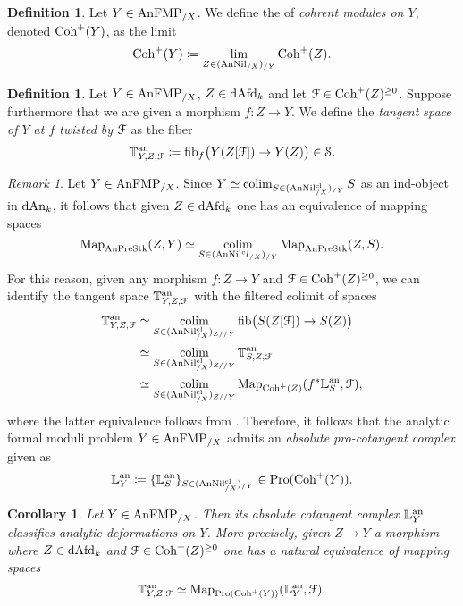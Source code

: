 \documentclass[10pt,a4paper,reqno]{amsart} %
\theoremstyle{plain}
\newtheorem{cor}[thm]{Corollary}
\theoremstyle{definition}
\newtheorem{defin}[thm]{Definition}
\theoremstyle{remark}
\newtheorem{rem}[thm]{Remark}
\numberwithin{equation}{section}
\begin{document}
\begin{defin}
    Let $Y \in \mathrm{AnFMP}_{/X}$. We define the \infcat of \emph{cohrent modules on $Y$}, denoted $\mathrm{Coh}^+(Y)$, as the limit
        \[
            \mathrm{Coh}^+(Y) \coloneqq \lim_{Z \in (\mathrm{AnNil}_{/X})_{/Y}}  \mathrm{Coh}^+(Z).
        \]
\end{defin}

\begin{defin} Let $Y \in \mathrm{AnFMP}_{/X}$, $Z \in \mathrm{dAfd}_k$ and let $\mathcal F \in \mathrm{Coh}^+(Z)^{\ge 0}$. Suppose furthermore that we are given a morphism $f \colon Z \to Y$.
    We define the \emph{tangent space of $Y$ at $f$ twisted by $\mathcal F$} as the fiber
        \[
            \mathbb T^\mathrm{an}_{Y, Z, \mathcal F} \coloneqq \mathrm{fib}_f\big( Y(Z[\mathcal F]) \to Y(Z) \big) 
            \in \mathcal S.  
        \]
\end{defin}

\begin{rem} Let $Y \in \mathrm{AnFMP}_{/X}$.
    Since $Y \simeq \operatorname*{colim}_{S \in (\mathrm{AnNil}^{\mathrm{cl}}_{/X})_{/Y}} S$ as an ind-object in $\mathrm{dAn}_k$, it follows that given $Z \in \mathrm{dAfd}_k$ one has an equivalence of mapping spaces
        \[
            \operatorname{Map}_{\mathrm{AnPreStk}}(Z, Y) \simeq \operatorname*{colim}_{S \in (\mathrm{AnNil}^cl_{/X})_{/Y}}  \operatorname{Map}_{\mathrm{AnPreStk}}(Z,S ).
        \]
    For this reason, given any morphism $f \colon Z \to Y$ and
    $\mathcal F \in \mathrm{Coh}^+(Z)^{\ge 0}$, we can identify the tangent space $\mathbb T^\mathrm{an}_{Y, Z, \mathcal F}$
    with the filtered colimit of spaces
        \begin{align*}
            \mathbb T^\mathrm{an}_{Y, Z, \mathcal F} & \simeq \operatorname*{colim}_{S \in (\mathrm{AnNil}^{\mathrm{cl}}_{/X})_{Z/ /Y}} \mathrm{fib} \big( S(Z[\mathcal F]) \to S(Z) \big) \\
                                & \simeq \operatorname*{colim}_{S \in (\mathrm{AnNil}^{\mathrm{cl}}_{/X})_{Z/ /Y}} \mathbb T^\mathrm{an}_{S, Z , \mathcal F } \\
                                & \simeq \operatorname*{colim}_{S \in (\mathrm{AnNil}^{\mathrm{cl}}_{/X})_{Z/ /Y}} \operatorname{Map}_{\mathrm{Coh}^+(Z)} (f^* \mathbb L^\mathrm{an}_S, \mathcal F),
        \end{align*}
    where the latter equivalence follows from \cite[Lemma 7.7]{Porta_Yu_Representability}. Therefore, it follows that
    the analytic formal moduli problem
    $Y \in \mathrm{AnFMP}_{/X}$ admits an \emph{absolute pro-cotangent complex} given as
        \[
           \mathbb L^\mathrm{an}_Y \coloneqq \{  \mathbb L^\mathrm{an}_S   \}_{S \in (\mathrm{AnNil}^{\mathrm{cl}}_{/X})_{/Y}} \in \mathrm{Pro}(\mathrm{Coh}^+(Y)).
        \]
\end{rem}   

\begin{cor}
    Let $Y \in \mathrm{AnFMP}_{/X}$. Then its absolute cotangent complex $\mathbb L^\mathrm{an}_Y$ classifies analytic deformations on $Y$. More precisely, given $Z \to Y$ a morphism
    where $Z \in \mathrm{dAfd}_k$ and $\mathcal F \in \mathrm{Coh}^+(Z)^{\ge 0}$ one has a natural equivalence of mapping spaces
        \[
            \mathbb T^\mathrm{an}_{Y, Z, \mathcal F} \simeq \operatorname{Map}_{\mathrm{Pro}(\mathrm{Coh}^+(Y))}(\mathbb L^\mathrm{an}_Y, \mathcal F).  
        \]
\end{cor}
\end{document}

